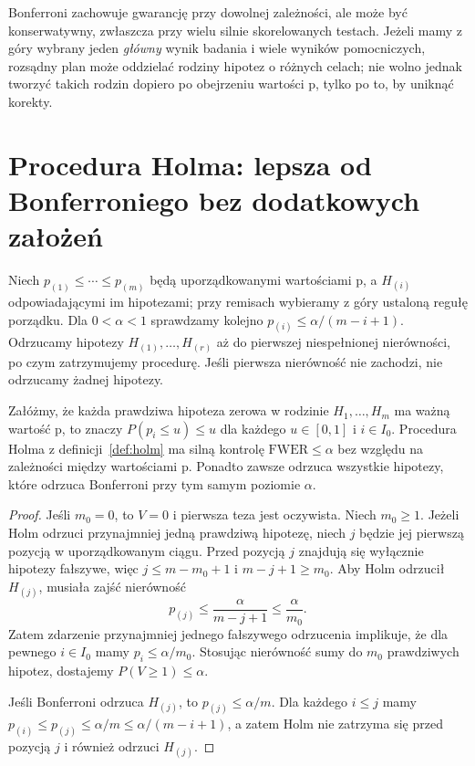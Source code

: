 \begin{uwaga}
Bonferroni zachowuje gwarancję przy dowolnej zależności,
ale może być konserwatywny, zwłaszcza przy wielu silnie
skorelowanych testach. Jeżeli mamy z góry wybrany
jeden \emph{główny} wynik badania i wiele wyników
pomocniczych, rozsądny plan może oddzielać rodziny
hipotez o różnych celach; nie wolno jednak tworzyć
takich rodzin dopiero po obejrzeniu wartości p, tylko
po to, by uniknąć korekty.
\end{uwaga}

\section{Procedura Holma: lepsza od Bonferroniego bez dodatkowych założeń}
\begin{definicja}\label{def:holm}
Niech $p_{(1)}\le\cdots\le p_{(m)}$ będą uporządkowanymi
wartościami p, a $H_{(i)}$ odpowiadającymi im hipotezami;
przy remisach wybieramy z góry ustaloną regułę porządku.
Dla $0<\alpha<1$ sprawdzamy kolejno
$p_{(i)}\le\alpha/(m-i+1)$. Odrzucamy hipotezy
$H_{(1)},\ldots,H_{(r)}$ aż do pierwszej niespełnionej
nierówności, po czym zatrzymujemy procedurę.
Jeśli pierwsza nierówność nie zachodzi, nie odrzucamy
żadnej hipotezy.
\end{definicja}

\begin{twierdzenie}
\label{thm:holm}
Załóżmy, że każda prawdziwa hipoteza zerowa w rodzinie
$H_1,\ldots,H_m$ ma ważną wartość p, to znaczy
$P(p_i\le u)\le u$ dla każdego $u\in[0,1]$ i
$i\in I_0$. Procedura Holma z definicji~\ref{def:holm}
ma silną kontrolę $\mathrm{FWER}\le\alpha$ bez względu
na zależności między wartościami p. Ponadto zawsze
odrzuca wszystkie hipotezy, które odrzuca Bonferroni
przy tym samym poziomie $\alpha$.
\end{twierdzenie}
\begin{proof}
Jeśli $m_0=0$, to $V=0$ i pierwsza teza jest oczywista.
Niech $m_0\ge1$. Jeżeli Holm odrzuci przynajmniej jedną
prawdziwą hipotezę, niech $j$ będzie jej pierwszą pozycją
w uporządkowanym ciągu. Przed pozycją $j$ znajdują się
wyłącznie hipotezy fałszywe, więc $j\le m-m_0+1$ i
$m-j+1\ge m_0$. Aby Holm odrzucił $H_{(j)}$, musiała
zajść nierówność
\[
 p_{(j)}\le\frac\alpha{m-j+1}\le\frac\alpha{m_0}.
\]
Zatem zdarzenie przynajmniej jednego fałszywego
odrzucenia implikuje, że dla pewnego $i\in I_0$ mamy
$p_i\le\alpha/m_0$. Stosując nierówność sumy do
$m_0$ prawdziwych hipotez, dostajemy $P(V\ge1)\le\alpha$.

Jeśli Bonferroni odrzuca $H_{(j)}$, to
$p_{(j)}\le\alpha/m$. Dla każdego $i\le j$
mamy $p_{(i)}\le p_{(j)}\le\alpha/m\le
\alpha/(m-i+1)$, a zatem Holm nie zatrzyma się
przed pozycją $j$ i również odrzuci $H_{(j)}$.
\end{proof}

